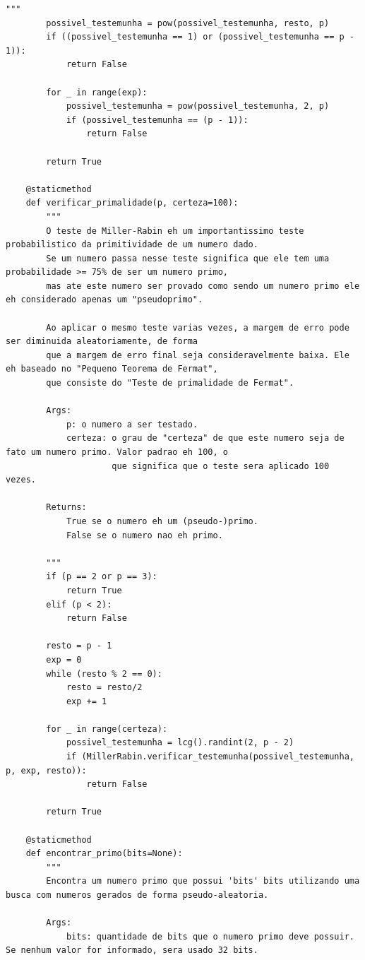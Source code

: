 \documentclass[a4paper,11pt]{article}
\theoremstyle{mytheor}
\begin{document}
\begin{lstlisting}[caption=Arquivo primality.py.]
        """
        possivel_testemunha = pow(possivel_testemunha, resto, p)
        if ((possivel_testemunha == 1) or (possivel_testemunha == p - 1)):
            return False

        for _ in range(exp):
            possivel_testemunha = pow(possivel_testemunha, 2, p)
            if (possivel_testemunha == (p - 1)):
                return False

        return True
    
    @staticmethod
    def verificar_primalidade(p, certeza=100):
        """
        O teste de Miller-Rabin eh um importantissimo teste probabilistico da primitividade de um numero dado.
        Se um numero passa nesse teste significa que ele tem uma probabilidade >= 75% de ser um numero primo,
        mas ate este numero ser provado como sendo um numero primo ele eh considerado apenas um "pseudoprimo".

        Ao aplicar o mesmo teste varias vezes, a margem de erro pode ser diminuida aleatoriamente, de forma
        que a margem de erro final seja consideravelmente baixa. Ele eh baseado no "Pequeno Teorema de Fermat",
        que consiste do "Teste de primalidade de Fermat".

        Args:
            p: o numero a ser testado.
            certeza: o grau de "certeza" de que este numero seja de fato um numero primo. Valor padrao eh 100, o
                     que significa que o teste sera aplicado 100 vezes.

        Returns:
            True se o numero eh um (pseudo-)primo.
            False se o numero nao eh primo.

        """
        if (p == 2 or p == 3): 
            return True
        elif (p < 2): 
            return False

        resto = p - 1
        exp = 0
        while (resto % 2 == 0):
            resto = resto/2
            exp += 1

        for _ in range(certeza):
            possivel_testemunha = lcg().randint(2, p - 2)
            if (MillerRabin.verificar_testemunha(possivel_testemunha, p, exp, resto)):
                return False

        return True

    @staticmethod
    def encontrar_primo(bits=None):
        """
        Encontra um numero primo que possui 'bits' bits utilizando uma busca com numeros gerados de forma pseudo-aleatoria. 

        Args:
            bits: quantidade de bits que o numero primo deve possuir. Se nenhum valor for informado, sera usado 32 bits.
        

\end{lstlisting}
\end{document}
